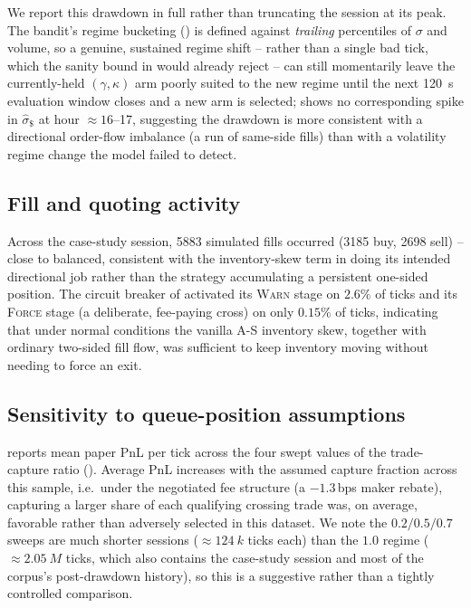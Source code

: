 \documentclass[11pt,a4paper]{article}
\begin{document}
We report this drawdown in full rather than truncating the session at its peak. The bandit's
regime bucketing () is defined against \emph{trailing} percentiles of $\sigma$
and volume, so a genuine, sustained regime shift -- rather than a single bad tick, which the
sanity bound in  would already reject -- can still momentarily leave the
currently-held $(\gamma,\kappa)$ arm poorly suited to the new regime until the next
\SI{120}{\second} evaluation window closes and a new arm is selected;  shows no
corresponding spike in $\hat\sigma_{\$}$ at hour $\approx 16$--17, suggesting the drawdown is more
consistent with a directional order-flow imbalance (a run of same-side fills) than with a
volatility regime change the model failed to detect.

\subsection{Fill and quoting activity}

Across the case-study session, \num{5883} simulated fills occurred (\num{3185} buy, \num{2698}
sell) -- close to balanced, consistent with the inventory-skew term in 
doing its intended directional job rather than the strategy accumulating a persistent one-sided
position. The circuit breaker of  activated its \textsc{Warn} stage on $2.6\%$
of ticks and its \textsc{Force} stage (a deliberate, fee-paying cross) on only $0.15\%$ of ticks,
indicating that under normal conditions the vanilla A-S inventory skew, together with ordinary
two-sided fill flow, was sufficient to keep inventory moving without needing to force an exit.

\subsection{Sensitivity to queue-position assumptions}

 reports mean paper PnL per tick across the four swept values of the
trade-capture ratio (). Average PnL increases with the assumed capture
fraction across this sample, i.e.\ under the negotiated fee structure (a $-1.3$\,bps maker
rebate), capturing a larger share of each qualifying crossing trade was, on average, favorable
rather than adversely selected in this dataset. We note the $0.2/0.5/0.7$ sweeps are much shorter
sessions ($\approx\SI{124}{k}$ ticks each) than the $1.0$ regime ($\approx\SI{2.05}{M}$ ticks,
which also contains the case-study session and most of the corpus's post-drawdown history), so
this is a suggestive rather than a tightly controlled comparison.
\end{document}
